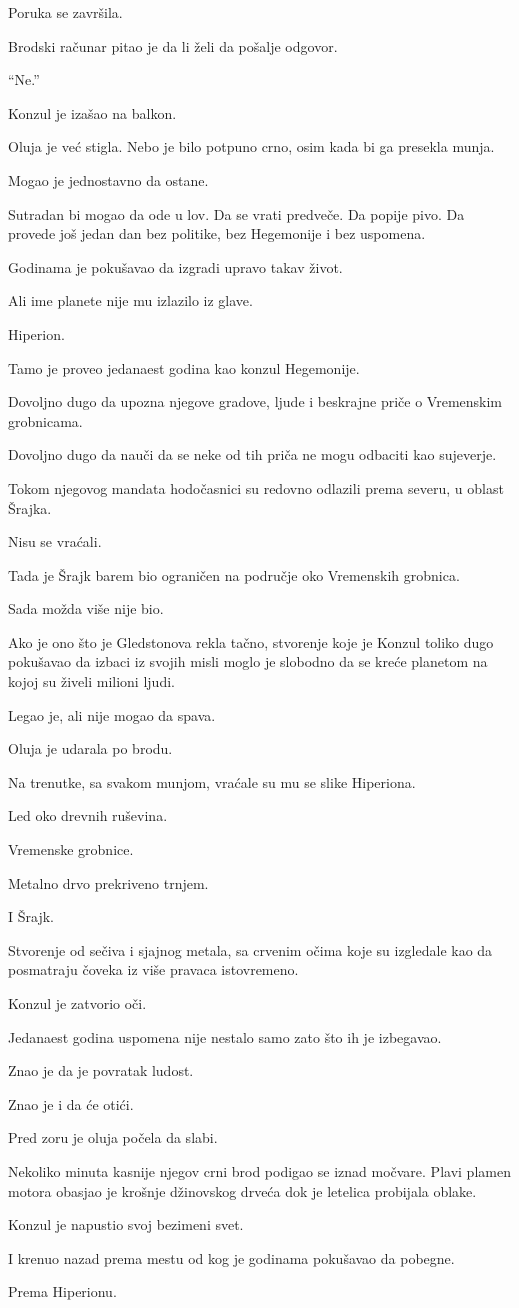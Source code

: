 Poruka se završila.

Brodski računar pitao je da li želi da pošalje odgovor.

``Ne.''

Konzul je izašao na balkon.

Oluja je već stigla. Nebo je bilo potpuno crno, osim kada bi ga presekla munja.

Mogao je jednostavno da ostane.

Sutradan bi mogao da ode u lov. Da se vrati predveče. Da popije pivo. Da provede još jedan dan bez politike, bez Hegemonije i bez uspomena.

Godinama je pokušavao da izgradi upravo takav život.

Ali ime planete nije mu izlazilo iz glave.

Hiperion.

Tamo je proveo jedanaest godina kao konzul Hegemonije.

Dovoljno dugo da upozna njegove gradove, ljude i beskrajne priče o Vremenskim grobnicama.

Dovoljno dugo da nauči da se neke od tih priča ne mogu odbaciti kao sujeverje.

Tokom njegovog mandata hodočasnici su redovno odlazili prema severu, u oblast Šrajka.

Nisu se vraćali.

Tada je Šrajk barem bio ograničen na područje oko Vremenskih grobnica.

Sada možda više nije bio.

Ako je ono što je Gledstonova rekla tačno, stvorenje koje je Konzul toliko dugo pokušavao da izbaci iz svojih misli moglo je slobodno da se kreće planetom na kojoj su živeli milioni ljudi.

Legao je, ali nije mogao da spava.

Oluja je udarala po brodu.

Na trenutke, sa svakom munjom, vraćale su mu se slike Hiperiona.

Led oko drevnih ruševina.

Vremenske grobnice.

Metalno drvo prekriveno trnjem.

I Šrajk.

Stvorenje od sečiva i sjajnog metala, sa crvenim očima koje su izgledale kao da posmatraju čoveka iz više pravaca istovremeno.

Konzul je zatvorio oči.

Jedanaest godina uspomena nije nestalo samo zato što ih je izbegavao.

Znao je da je povratak ludost.

Znao je i da će otići.

Pred zoru je oluja počela da slabi.

Nekoliko minuta kasnije njegov crni brod podigao se iznad močvare. Plavi plamen motora obasjao je krošnje džinovskog drveća dok je letelica probijala oblake.

Konzul je napustio svoj bezimeni svet.

I krenuo nazad prema mestu od kog je godinama pokušavao da pobegne.

Prema Hiperionu.
